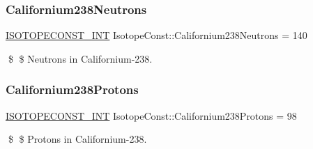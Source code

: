 \subsubsection{\texorpdfstring{Californium238\+Neutrons}{Californium238Neutrons}}
{\footnotesize\ttfamily \mbox{\hyperlink{group___isotope_const-_macros_ga5f18360b3e99483a35c32d789e62621c}{I\+S\+O\+T\+O\+P\+E\+C\+O\+N\+S\+T\+\_\+\+I\+NT}} Isotope\+Const\+::\+Californium238\+Neutrons = 140}

\$ \$ Neutrons in Californium-\/238. \mbox{\label{group___isotope_const-_californium-_cf238_ga24e323ccd15d85ce38414f4d09714a07}} 
\subsubsection{\texorpdfstring{Californium238\+Protons}{Californium238Protons}}
{\footnotesize\ttfamily \mbox{\hyperlink{group___isotope_const-_macros_ga5f18360b3e99483a35c32d789e62621c}{I\+S\+O\+T\+O\+P\+E\+C\+O\+N\+S\+T\+\_\+\+I\+NT}} Isotope\+Const\+::\+Californium238\+Protons = 98}

\$ \$ Protons in Californium-\/238. 